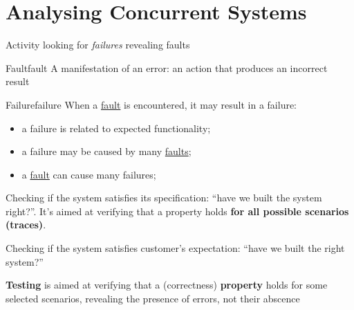 \chapter{Analysing Concurrent Systems}\label{chap:analysing_concurrent_systems} %
\begin{note}[Testing]
    Activity looking for \textit{failures} revealing faults
    \begin{definition}{Fault}{fault}
        A manifestation of an error: an action that produces an incorrect result
    \end{definition}
    \begin{definition}{Failure}{failure}
        When a \hyperref[def:fault]{fault} is encountered, it may result in a failure:
        \begin{itemize}
            \item a failure is related to expected functionality;
            \item a failure may be caused by many \hyperref[def:fault]{faults};
            \item a \hyperref[def:fault]{fault} can cause many failures;
        \end{itemize}
    \end{definition}
\end{note}
\begin{note}[Verification]
    Checking if the system satisfies its specification: ``have we built the system right?''.
    It's aimed at verifying that a property holds \textbf{for all possible scenarios (traces)}.
\end{note}
\begin{note}[Validation]
    Checking if the system satisfies customer's expectation: ``have we built the right system?'' 
\end{note}
\begin{note}[Testing]
    \textbf{Testing} is aimed at verifying that a (correctness) \textbf{property} holds for some selected scenarios, revealing the presence of errors, not their abscence
\end{note}
